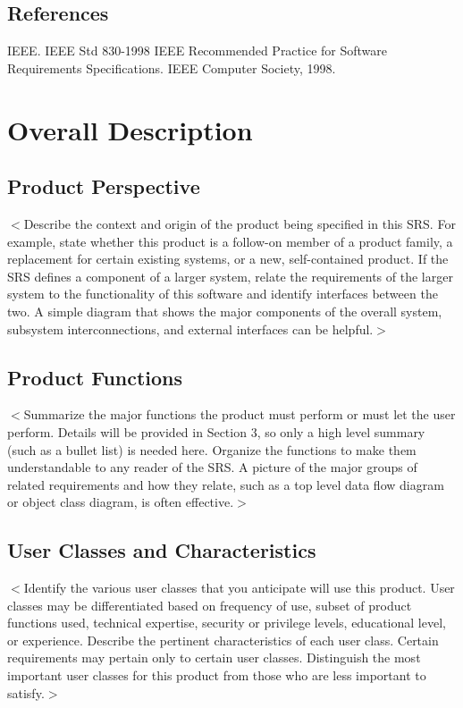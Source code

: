 \documentclass[a4paper, 11pt]{scrreprt}
\begin{document}
\section{References}
IEEE. IEEE Std 830-1998 IEEE Recommended Practice for Software Requirements Specifications. IEEE Computer Society, 1998.


\chapter{Overall Description}

\section{Product Perspective}
$<$Describe the context and origin of the product being specified in this SRS.  
For example, state whether this product is a follow-on member of a product 
family, a replacement for certain existing systems, or a new, self-contained 
product. If the SRS defines a component of a larger system, relate the 
requirements of the larger system to the functionality of this software and 
identify interfaces between the two. A simple diagram that shows the major 
components of the overall system, subsystem interconnections, and external 
interfaces can be helpful.$>$

\section{Product Functions}
$<$Summarize the major functions the product must perform or must let the user 
perform. Details will be provided in Section 3, so only a high level summary 
(such as a bullet list) is needed here. Organize the functions to make them 
understandable to any reader of the SRS. A picture of the major groups of 
related requirements and how they relate, such as a top level data flow diagram 
or object class diagram, is often effective.$>$

\section{User Classes and Characteristics}
$<$Identify the various user classes that you anticipate will use this product.  
User classes may be differentiated based on frequency of use, subset of product 
functions used, technical expertise, security or privilege levels, educational 
level, or experience. Describe the pertinent characteristics of each user class.  
Certain requirements may pertain only to certain user classes. Distinguish the 
most important user classes for this product from those who are less important 
to satisfy.$>$
\end{document}
